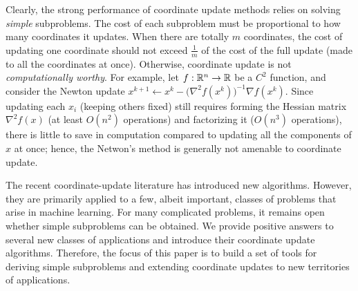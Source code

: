 
Clearly, the strong performance of coordinate
update methods relies on solving \emph{simple} subproblems. The cost of each subproblem must be proportional to how many coordinates it updates. %
When there are totally $m$ coordinates, the cost of updating one coordinate should not exceed $\frac{1}{m}$ of the cost of the full update (made to all the coordinates at once). Otherwise, coordinate update is not \emph{computationally worthy}. For example, let  $f:\mathbb{R}^n\to \mathbb{R}$ be  a $C^2$ function, and consider the Newton update  $x^{k+1} \gets x^k - \big(\nabla^2 f(x^k)\big)^{-1}\nabla f(x^k)$. Since updating each $x_i$ (keeping others  fixed) still requires forming the Hessian matrix $\nabla^2 f(x)$ (at least $O(n^2)$ operations) and factorizing it ($O(n^3)$ operations), there is little to save in computation compared to updating all the components of $x$ at once; hence, the Netwon's method is generally not amenable to coordinate update.

The recent coordinate-update literature has introduced new algorithms. However, they are primarily applied to a few, albeit important, classes of problems  that arise in machine learning. For many complicated problems,  it remains open whether simple subproblems can be obtained. We provide positive answers to several new classes of applications and introduce their coordinate update algorithms. %
Therefore, the focus of this paper is to build a set of tools for deriving simple subproblems and extending  coordinate updates to new territories of applications.

